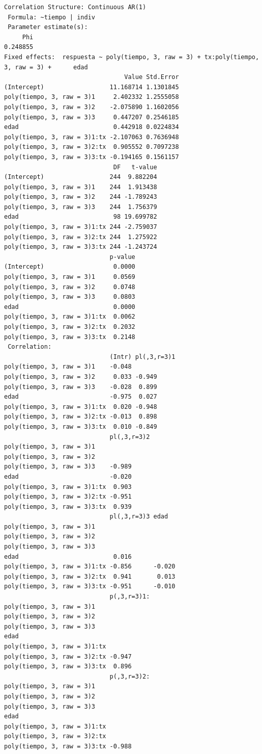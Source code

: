 \documentclass[
]{book}
\begin{document}
\begin{verbatim}
Correlation Structure: Continuous AR(1)
 Formula: ~tiempo | indiv 
 Parameter estimate(s):
     Phi 
0.248855 
Fixed effects:  respuesta ~ poly(tiempo, 3, raw = 3) + tx:poly(tiempo, 3, raw = 3) +      edad 
                                 Value Std.Error
(Intercept)                  11.168714 1.1301845
poly(tiempo, 3, raw = 3)1     2.402332 1.2555058
poly(tiempo, 3, raw = 3)2    -2.075890 1.1602056
poly(tiempo, 3, raw = 3)3     0.447207 0.2546185
edad                          0.442918 0.0224834
poly(tiempo, 3, raw = 3)1:tx -2.107063 0.7636948
poly(tiempo, 3, raw = 3)2:tx  0.905552 0.7097238
poly(tiempo, 3, raw = 3)3:tx -0.194165 0.1561157
                              DF   t-value
(Intercept)                  244  9.882204
poly(tiempo, 3, raw = 3)1    244  1.913438
poly(tiempo, 3, raw = 3)2    244 -1.789243
poly(tiempo, 3, raw = 3)3    244  1.756379
edad                          98 19.699782
poly(tiempo, 3, raw = 3)1:tx 244 -2.759037
poly(tiempo, 3, raw = 3)2:tx 244  1.275922
poly(tiempo, 3, raw = 3)3:tx 244 -1.243724
                             p-value
(Intercept)                   0.0000
poly(tiempo, 3, raw = 3)1     0.0569
poly(tiempo, 3, raw = 3)2     0.0748
poly(tiempo, 3, raw = 3)3     0.0803
edad                          0.0000
poly(tiempo, 3, raw = 3)1:tx  0.0062
poly(tiempo, 3, raw = 3)2:tx  0.2032
poly(tiempo, 3, raw = 3)3:tx  0.2148
 Correlation: 
                             (Intr) pl(,3,r=3)1
poly(tiempo, 3, raw = 3)1    -0.048            
poly(tiempo, 3, raw = 3)2     0.033 -0.949     
poly(tiempo, 3, raw = 3)3    -0.028  0.899     
edad                         -0.975  0.027     
poly(tiempo, 3, raw = 3)1:tx  0.020 -0.948     
poly(tiempo, 3, raw = 3)2:tx -0.013  0.898     
poly(tiempo, 3, raw = 3)3:tx  0.010 -0.849     
                             pl(,3,r=3)2
poly(tiempo, 3, raw = 3)1               
poly(tiempo, 3, raw = 3)2               
poly(tiempo, 3, raw = 3)3    -0.989     
edad                         -0.020     
poly(tiempo, 3, raw = 3)1:tx  0.903     
poly(tiempo, 3, raw = 3)2:tx -0.951     
poly(tiempo, 3, raw = 3)3:tx  0.939     
                             pl(,3,r=3)3 edad  
poly(tiempo, 3, raw = 3)1                      
poly(tiempo, 3, raw = 3)2                      
poly(tiempo, 3, raw = 3)3                      
edad                          0.016            
poly(tiempo, 3, raw = 3)1:tx -0.856      -0.020
poly(tiempo, 3, raw = 3)2:tx  0.941       0.013
poly(tiempo, 3, raw = 3)3:tx -0.951      -0.010
                             p(,3,r=3)1:
poly(tiempo, 3, raw = 3)1               
poly(tiempo, 3, raw = 3)2               
poly(tiempo, 3, raw = 3)3               
edad                                    
poly(tiempo, 3, raw = 3)1:tx            
poly(tiempo, 3, raw = 3)2:tx -0.947     
poly(tiempo, 3, raw = 3)3:tx  0.896     
                             p(,3,r=3)2:
poly(tiempo, 3, raw = 3)1               
poly(tiempo, 3, raw = 3)2               
poly(tiempo, 3, raw = 3)3               
edad                                    
poly(tiempo, 3, raw = 3)1:tx            
poly(tiempo, 3, raw = 3)2:tx            
poly(tiempo, 3, raw = 3)3:tx -0.988     


\end{verbatim}
\end{document}

